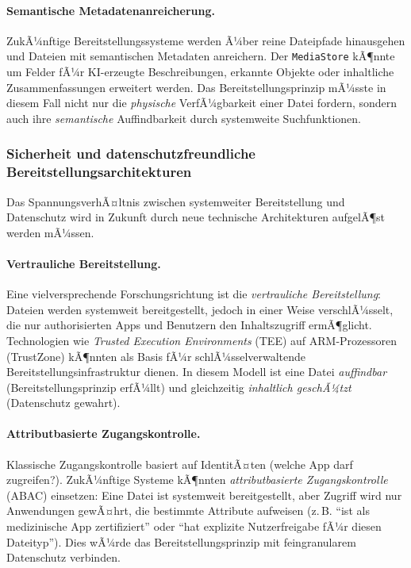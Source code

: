 ﻿\documentclass[12pt, a4paper]{article}
\begin{document}
\paragraph{Semantische Metadatenanreicherung.}
ZukÃ¼nftige Bereitstellungssysteme werden Ã¼ber reine Dateipfade hinausgehen und Dateien
mit semantischen Metadaten anreichern. Der \texttt{MediaStore} kÃ¶nnte um Felder fÃ¼r
KI-erzeugte Beschreibungen, erkannte Objekte oder inhaltliche Zusammenfassungen erweitert
werden. Das Bereitstellungsprinzip mÃ¼sste in diesem Fall nicht nur die \emph{physische}
VerfÃ¼gbarkeit einer Datei fordern, sondern auch ihre \emph{semantische} Auffindbarkeit
durch systemweite Suchfunktionen.

\subsubsection{Sicherheit und datenschutzfreundliche Bereitstellungsarchitekturen}

Das SpannungsverhÃ¤ltnis zwischen systemweiter Bereitstellung und Datenschutz wird in
Zukunft durch neue technische Architekturen aufgelÃ¶st werden mÃ¼ssen.

\paragraph{Vertrauliche Bereitstellung.}
Eine vielversprechende Forschungsrichtung ist die \emph{vertrauliche Bereitstellung}:
Dateien werden systemweit bereitgestellt, jedoch in einer Weise verschlÃ¼sselt, die nur
authorisierten Apps und Benutzern den Inhaltszugriff ermÃ¶glicht. Technologien wie
\emph{Trusted Execution Environments} (TEE) auf ARM-Prozessoren (TrustZone) kÃ¶nnten
als Basis fÃ¼r schlÃ¼sselverwaltende Bereitstellungsinfrastruktur dienen. In diesem Modell
ist eine Datei \emph{auffindbar} (Bereitstellungsprinzip erfÃ¼llt) und gleichzeitig
\emph{inhaltlich geschÃ¼tzt} (Datenschutz gewahrt).

\paragraph{Attributbasierte Zugangskontrolle.}
Klassische Zugangskontrolle basiert auf IdentitÃ¤ten (welche App darf zugreifen?).
ZukÃ¼nftige Systeme kÃ¶nnten \emph{attributbasierte Zugangskontrolle} (ABAC) einsetzen:
Eine Datei ist systemweit bereitgestellt, aber Zugriff wird nur Anwendungen gewÃ¤hrt,
die bestimmte Attribute aufweisen (z.\,B. \enquote{ist als medizinische App zertifiziert}
oder \enquote{hat explizite Nutzerfreigabe fÃ¼r diesen Dateityp}). Dies wÃ¼rde das
Bereitstellungsprinzip mit feingranularem Datenschutz verbinden.
\end{document}
